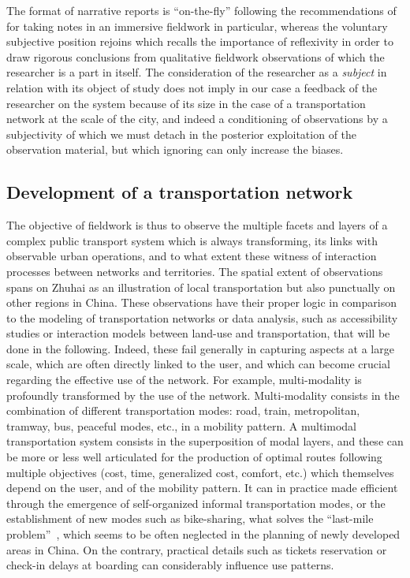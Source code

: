  The format of narrative reports is ``on-the-fly'' following the recommendations of \cite{goffman1989fieldwork} for taking notes in an immersive fieldwork in particular, whereas the voluntary subjective position rejoins \cite{ball1990self} which recalls the importance of reflexivity in order to draw rigorous conclusions from qualitative fieldwork observations of which the researcher is a part in itself. The consideration of the researcher as a \emph{subject} in relation with its object of study does not imply in our case a feedback of the researcher on the system because of its size in the case of a transportation network at the scale of the city, and indeed a conditioning of observations by a subjectivity of which we must detach in the posterior exploitation of the observation material, but which ignoring can only increase the biases.


\subsection{Development of a transportation network}

The objective of fieldwork is thus to observe the multiple facets and layers of a complex public transport system which is always transforming, its links with observable urban operations, and to what extent these witness of interaction processes between networks and territories. The spatial extent of observations spans on Zhuhai as an illustration of local transportation but also punctually on other regions in China. These observations have their proper logic in comparison to the modeling of transportation networks or data analysis, such as accessibility studies or interaction models between land-use and transportation, that will be done in the following. Indeed, these fail generally in capturing aspects at a large scale, which are often directly linked to the user, and which can become crucial regarding the effective use of the network. For example, multi-modality is profoundly transformed by the use of the network. Multi-modality consists in the combination of different transportation modes: road, train, metropolitan, tramway, bus, peaceful modes, etc., in a mobility pattern. A multimodal transportation system consists in the superposition of modal layers, and these can be more or less well articulated for the production of optimal routes following multiple objectives (cost, time, generalized cost, comfort, etc.) which themselves depend on the user, and of the mobility pattern. It can in practice made efficient through the emergence of self-organized informal transportation modes, or the establishment of new modes such as bike-sharing, what solves the ``last-mile problem''~\citep{liu2012solving}, which seems to be often neglected in the planning of newly developed areas in China. On the contrary, practical details such as tickets reservation or check-in delays at boarding can considerably influence use patterns.

